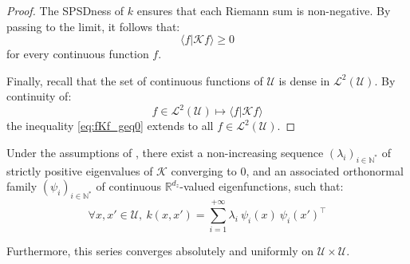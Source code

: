 \begin{proof}
	The SPSDness of $k$ ensures that each Riemann sum is non-negative. By passing to the limit, it follows that:
	\begin{equation}
		\langle f|\mathcal{K}f\rangle\geq0\label{eq:fKf_geq0}
	\end{equation}
	for every continuous function $f$.

	Finally, recall that the set of continuous functions of $\mathcal{U}$ is dense in $\mathcal{L}^2(\mathcal{U})$. By continuity of:
	\begin{equation}
		f\in\mathcal{L}^2(\mathcal{U})\mapsto\langle f|\mathcal{K}f\rangle
	\end{equation}
	the inequality \eqref{eq:fKf_geq0} extends to all $f\in\mathcal{L}^2(\mathcal{U})$.
\end{proof}

\begin{proposition}\label{th:Mercer}
	Under the assumptions of , there exist a non-increasing sequence $(\lambda_i)_{i\in\mathbb{N}^*}$ of strictly positive eigenvalues of $\mathcal{K}$ converging to $0$, and an associated orthonormal family $(\psi_i)_{i\in\mathbb{N}^*}$ of continuous $\mathbb{R}^{d_z}$-valued eigenfunctions, such that:
	\begin{equation}
		\forall x,x'\in\mathcal{U},\:k(x,x')=\sum_{i=1}^{+\infty}\lambda_i\:\psi_i(x)\:\psi_i(x')^\top\label{eq:Mercer}
	\end{equation}

	Furthermore, this series converges absolutely and uniformly on $\mathcal{U}\times\mathcal{U}$.
\end{proposition}

